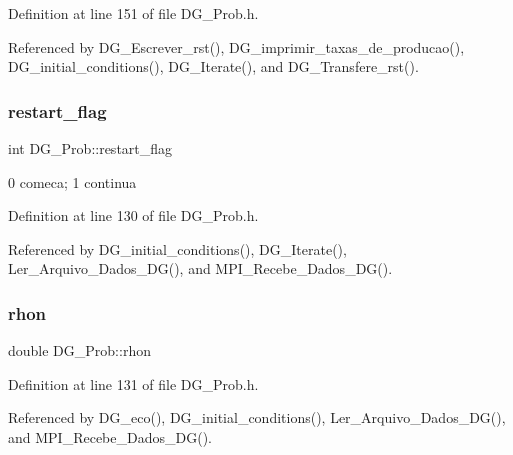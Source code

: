 Definition at line 151 of file D\+G\+\_\+\+Prob.\+h.



Referenced by D\+G\+\_\+\+Escrever\+\_\+rst(), D\+G\+\_\+imprimir\+\_\+taxas\+\_\+de\+\_\+producao(), D\+G\+\_\+initial\+\_\+conditions(), D\+G\+\_\+\+Iterate(), and D\+G\+\_\+\+Transfere\+\_\+rst().

\mbox{\label{classDG__Prob_ab91c87bf52e188499511bc8161a1ac88}} 
\subsubsection{\texorpdfstring{restart\+\_\+flag}{restart\_flag}}
{\footnotesize\ttfamily int D\+G\+\_\+\+Prob\+::restart\+\_\+flag\hspace{0.3cm}{\ttfamily [private]}}



0 comeca; 1 continua 



Definition at line 130 of file D\+G\+\_\+\+Prob.\+h.



Referenced by D\+G\+\_\+initial\+\_\+conditions(), D\+G\+\_\+\+Iterate(), Ler\+\_\+\+Arquivo\+\_\+\+Dados\+\_\+\+D\+G(), and M\+P\+I\+\_\+\+Recebe\+\_\+\+Dados\+\_\+\+D\+G().

\mbox{\label{classDG__Prob_a0eadc4c74c80d41d7bd7baee54d6f98d}} 
\subsubsection{\texorpdfstring{rhon}{rhon}}
{\footnotesize\ttfamily double D\+G\+\_\+\+Prob\+::rhon\hspace{0.3cm}{\ttfamily [private]}}



Definition at line 131 of file D\+G\+\_\+\+Prob.\+h.



Referenced by D\+G\+\_\+eco(), D\+G\+\_\+initial\+\_\+conditions(), Ler\+\_\+\+Arquivo\+\_\+\+Dados\+\_\+\+D\+G(), and M\+P\+I\+\_\+\+Recebe\+\_\+\+Dados\+\_\+\+D\+G().

\mbox{\label{classDG__Prob_a067b5b8e0add791484c168020e960401}} 
